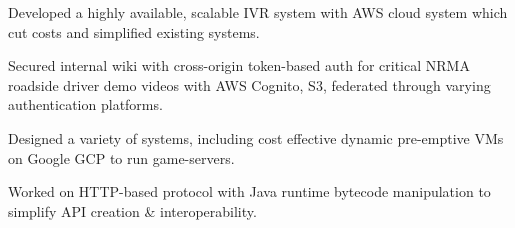 \documentclass[a4paper]{deedy-resume}
\begin{document}
\begin{minipage}[t]{0.63\textwidth}
\sectionspace



\begin{tightitemize}
\item Developed a highly available, scalable IVR system
	  with AWS cloud system which cut costs and simplified
	  existing systems.
\item Secured internal wiki with cross-origin token-based
	  auth for critical NRMA roadside driver demo videos
	  with AWS Cognito, S3, federated through varying
	  authentication platforms.
\end{tightitemize}

\sectionspace



\begin{tightitemize}
\item Designed a variety of systems, including cost effective
	  dynamic pre-emptive VMs on Google GCP to run game-servers.
\item Worked on HTTP-based protocol with Java runtime bytecode
	  manipulation to simplify API creation \& interoperability.
\end{tightitemize}

\sectionspace

\end{minipage} %
\end{document}
